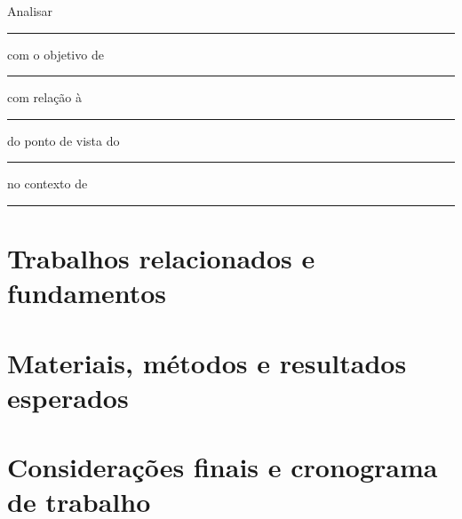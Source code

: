\documentclass[12pt]{uftpibicsic}
\begin{document}
Analisar \rule{5cm}{0.4pt}
com o objetivo de \rule{5cm}{0.4pt}
com relação à \rule{5cm}{0.4pt}
do ponto de vista do \rule{5cm}{0.4pt}
no contexto de \rule{5cm}{0.4pt}

\chapter{Trabalhos relacionados e fundamentos}







\chapter{Materiais, métodos e resultados esperados}


\chapter{Considerações finais e cronograma de trabalho}



\end{document}
